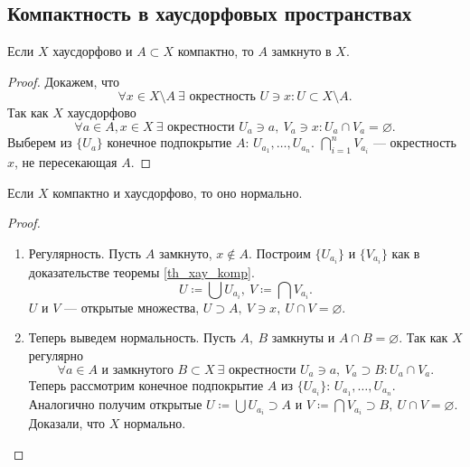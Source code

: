 \documentclass[11pt]{book}
\theoremstyle{definition}
\theoremstyle{plain}
\theoremstyle{plain}
\theoremstyle{definition}
\theoremstyle{remark}
\begin{document}
\subsection{Компактность в хаусдорфовых пространствах}
\begin{thm}\label{th_xay_komp}
    Если $ X$ хаусдорфово и  $ A \subset X$ компактно, то $ A$ замкнуто в  $ X$.
\end{thm}
\begin{proof}
    Докажем, что
    \[
	\forall x \in  X \setminus A~ \exists \text{ окрестность }U \ni x : U\subset X \setminus A
    .\]
    Так как $ X$ хаусдорфово
    \[
	\forall a \in A, x \in  X ~ \exists \text{ окрестности } U_a \ni a, ~ V_a \ni x: U_a \cap V_a = \varnothing
    .\]
    Выберем из $ \{U_a\}$ конечное подпокрытие $ A$:
    $U_{a_1}, \ldots , U_{a_n}$.
    $ \bigcap_{i=1}^{n} V_{a_i} $ --- окрестность $ x$, не пересекающая  $ A$.
\end{proof}
\begin{thm}
    Если $ X$ компактно и хаусдорфово, то оно нормально.
\end{thm}
\begin{proof}
    $ $
    \begin{enumerate}
	\item Регулярность.  Пусть $ A$ замкнуто,  $ x \not\in A$. Построим $ \{U_{a_i}\}$ и $ \{V_{a_i}\}$ как в доказательстве теоремы \ref{th_xay_komp}.
	    \[
		U \coloneqq \bigcup U_{a_i}, ~ V \coloneqq \bigcap V_{a_i}
	    .\]
	    $ U \text{ и } V$ --- открытые множества,  $ U \supset A, ~V \ni x, ~ U \cap V = \varnothing$.
	\item Теперь выведем нормальность. Пусть $ A, ~ B$ замкнуты и  $ A \cap B = \varnothing$. Так как $ X$ регулярно
	    \[
		\forall a \in  A \text{ и замкнутого }  B \subset X ~ \exists \text{ окрестности } U_{a} \ni a, ~ V_a \supset B: U_a  \cap V_a
	    .\]
	    Теперь рассмотрим конечное подпокрытие $ A$ из $ \{U_{a_i}\}$: $ U_{a_1}, \ldots , U_{a_n}$.
	    Аналогично получим открытые $ U \coloneqq \bigcup U_{a_i} \supset A$ и $ V \coloneqq \bigcap V_{a_i} \supset B, ~ U \cap V = \varnothing$. Доказали, что $ X$ нормально.
    \end{enumerate}
\end{proof}
\end{document}

